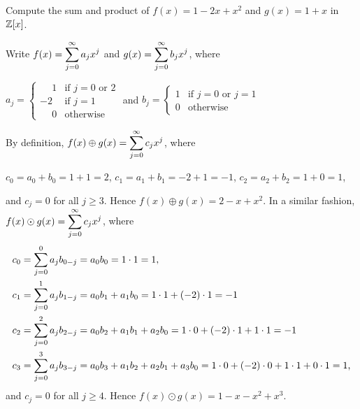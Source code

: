 \documentclass[11pt,fleqn,dvipsnames,usenames]{article}
\begin{document}
\begin{example}
Compute the sum and product of $f(x) = 1 - 2x + x^2$ and $g(x) = 1 + x$ in $\mathbb{Z}[x]$.
\end{example}
%
\begin{solution}
Write $f(x) = \displaystyle\sum\limits_{j=0}^{\infty}a_{j}x^{j}$ and $g(x) = \displaystyle\sum\limits_{j=0}^{\infty}b_{j}x^{j}$, where
\begin{center}
$a_{j} = \begin{cases}\phantom{-}1 & \text{if } j=0\text{ or }2\\-2 & \text{if } j = 1\\\phantom{-}0 & \text{otherwise}\end{cases}$ and 
$b_{j} = \begin{cases}1 & \text{if } j=0\text{ or }j=1\\0 & \text{otherwise}\end{cases}$
\end{center}
By definition, $f(x)\oplus g(x) = \displaystyle\sum\limits_{j=0}^{\infty}c_{j}x^{j}$, where
\begin{center}
$c_{0} = a_{0} + b_{0} = 1 + 1 = 2$,\hspace{1cm} $c_{1} = a_{1} + b_{1} = -2 + 1 = -1$,\hspace{1cm} $c_{2} = a_{2} + b_{2} = 1 + 0 = 1$,
\end{center}
and $c_{j} = 0$ for all $j\geq 3$.  Hence $f(x) \oplus g(x) = 2 - x + x^2$.  In a similar fashion, $f(x)\odot g(x) = \displaystyle\sum\limits_{j=0}^{\infty}c_{j}x^{j}$, where
\begin{align*}
c_{0} &= \displaystyle\sum\limits_{j=0}^{0}a_{j}b_{0-j} = a_{0}b_{0} = 1\cdot 1 = 1,\\
c_{1} &= \displaystyle\sum\limits_{j=0}^{1}a_{j}b_{1-j} = a_{0}b_{1} + a_{1}b_{0} = 1\cdot 1 + (-2)\cdot 1 = -1\\
c_{2} &= \displaystyle\sum\limits_{j=0}^{2}a_{j}b_{2-j} = a_{0}b_{2} + a_{1}b_{1} + a_{2}b_{0} = 1\cdot 0 + (-2)\cdot 1 + 1\cdot 1 = -1\\
c_{3} &= \displaystyle\sum\limits_{j=0}^{3}a_{j}b_{3-j} = a_{0}b_{3} + a_{1}b_{2} + a_{2}b_{1} + a_{3}b_{0} = 1\cdot 0 + (-2)\cdot 0 + 1\cdot 1 + 0\cdot 1 = 1\text{,}
\end{align*}
and $c_{j} = 0$ for all $j\geq 4$.  Hence $f(x) \odot g(x) = 1 - x - x^2 + x^3$.
\end{solution}
\vsp
\end{document}
